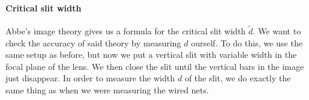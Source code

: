 \paragraph{Critical slit width}
\label{chap::slit}
Abbe's image theory gives us a formula for the critical slit width $\tilde{d}$.
We want to check the accuracy of said theory by measuring $d$ ourself.
To do this, we use the same setup as before, but now we put a vertical slit with variable width in the focal plane of the lens. 
We then close the slit until the vertical bars in the image just disappear.
In order to measure the width $d$ of the slit, we do exactly the same thing as when we were measuring the wired nets. 
